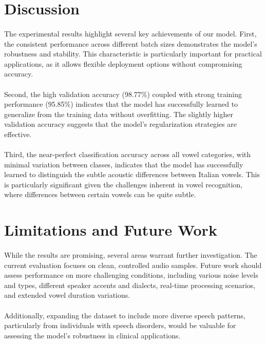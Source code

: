 \section{Discussion}
\label{sec:discussion}

\paragraph{}
The experimental results highlight several key achievements of our model. First, the consistent performance across different batch sizes demonstrates the model's robustness and stability. This characteristic is particularly important for practical applications, as it allows flexible deployment options without compromising accuracy.

\paragraph{}
Second, the high validation accuracy (98.77\%) coupled with strong training performance (95.85\%) indicates that the model has successfully learned to generalize from the training data without overfitting. The slightly higher validation accuracy suggests that the model's regularization strategies are effective.

\paragraph{}
Third, the near-perfect classification accuracy across all vowel categories, with minimal variation between classes, indicates that the model has successfully learned to distinguish the subtle acoustic differences between Italian vowels. This is particularly significant given the challenges inherent in vowel recognition, where differences between certain vowels can be quite subtle.

\section{Limitations and Future Work}
\label{sec:limitations}

\paragraph{}
While the results are promising, several areas warrant further investigation. The current evaluation focuses on clean, controlled audio samples. Future work should assess performance on more challenging conditions, including various noise levels and types, different speaker accents and dialects, real-time processing scenarios, and extended vowel duration variations.

\paragraph{}
Additionally, expanding the dataset to include more diverse speech patterns, particularly from individuals with speech disorders, would be valuable for assessing the model's robustness in clinical applications.
